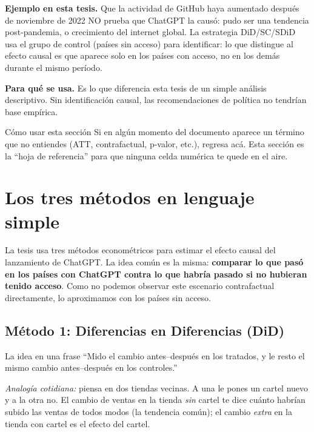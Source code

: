 \documentclass[11pt,a4paper]{article}
\begin{document}
\textbf{Ejemplo en esta tesis.} Que la actividad de GitHub haya aumentado después de noviembre de 2022 NO prueba que ChatGPT la causó: pudo ser una tendencia post-pandemia, o crecimiento del internet global. La estrategia DiD/SC/SDiD usa el grupo de control (países sin acceso) para identificar: lo que distingue al efecto causal es que aparece solo en los países con acceso, no en los demás durante el mismo período.

\textbf{Para qué se usa.} Es lo que diferencia esta tesis de un simple análisis descriptivo. Sin identificación causal, las recomendaciones de política no tendrían base empírica.

\begin{ideabox}{Cómo usar esta sección}
Si en algún momento del documento aparece un término que no entiendes (ATT, contrafactual, p-valor, etc.), regresa acá. Esta sección es la ``hoja de referencia'' para que ninguna celda numérica te quede en el aire.
\end{ideabox}

\section{Los tres métodos en lenguaje simple}

La tesis usa tres métodos econométricos para estimar el efecto causal del lanzamiento de ChatGPT. La idea común es la misma: \textbf{comparar lo que pasó en los países con ChatGPT contra lo que habría pasado si no hubieran tenido acceso}. Como no podemos observar este escenario contrafactual directamente, lo aproximamos con los países sin acceso.

\subsection{Método 1: Diferencias en Diferencias (DiD)}

\begin{ideabox}{La idea en una frase}
``Mido el cambio antes--después en los tratados, y le resto el mismo cambio antes--después en los controles.''
\end{ideabox}

\textit{Analogía cotidiana:} piensa en dos tiendas vecinas. A una le pones un cartel nuevo y a la otra no. El cambio de ventas en la tienda \emph{sin} cartel te dice cuánto habrían subido las ventas de todos modos (la tendencia común); el cambio \emph{extra} en la tienda con cartel es el efecto del cartel.
\end{document}
